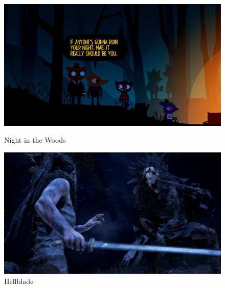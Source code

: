\begin{figure}
    \centering
    \begin{minipage}{.49\textwidth}
        \includegraphics[width=\textwidth]{imgs/night-in-the-woods.jpg}
        \caption{Night in the Woods}
        \label{fig:night-woods}
    \end{minipage}
    \begin{minipage}{.49\textwidth}
        \includegraphics[width=\textwidth]{imgs/hellblade.jpg}
        \caption{Hellblade}
        \label{fig:hellblade}
    \end{minipage}
\end{figure}



